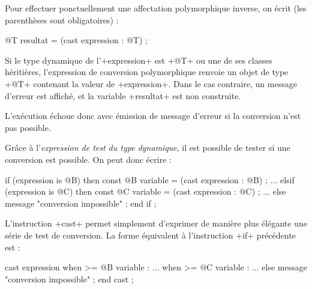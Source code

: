 Pour effectuer ponctuellement une affectation polymorphique inverse, on écrit (les parenthèses sont obligatoires) :

\begin{galgas}
@T resultat = (cast expression : @T) ;
\end{galgas}

Si le type dynamique de l'\ggs+expression+ est \ggs+@T+ ou une de ses classes héritières, l'expression de conversion polymorphique renvoie un objet de type \ggs+@T+ contenant la valeur de \ggs+expression+. Dans le cas contraire, un message d'erreur est affiché, et la variable \ggs+resultat+ est non construite.

L'exécution échoue donc avec émission de message d'erreur si la conversion n'est pas possible. 


Grâce à l'\emph{expression de test du type dynamique}, il est possible de tester si une conversion est possible. On peut donc écrire :

\begin{galgas}
if (expression is @B) then
  const @B variable = (cast expression : @B) ;
  ...
elsif (expression is @C) then
  const @C variable = (cast expression : @C) ;
  ...
else
  message "conversion impossible" ;
end if ;
\end{galgas}

L'instruction \ggs+cast+ permet simplement d'exprimer de manière plus élégante une série de test de conversion. La forme équivalent à l'instruction \ggs+if+ précédente est :

\begin{galgas}
cast expression
when >= @B variable :
  ...
when >= @C variable :
  ...
else
  message "conversion impossible" ;
end cast ;
\end{galgas}


